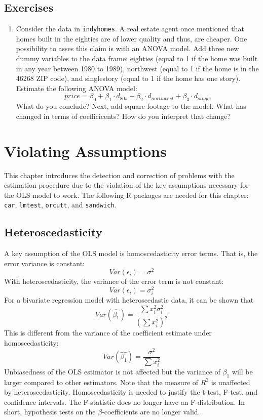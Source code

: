 \documentclass[
]{article}
\providecommand{\tightlist}{%
  \setlength{\itemsep}{0pt}\setlength{\parskip}{0pt}}
\begin{document}
\hypertarget{exercises}{%
\subsection{Exercises}\label{exercises}}

\begin{enumerate}
\def\labelenumi{\arabic{enumi}.}
\tightlist
\item
  Consider the data in \texttt{indyhomes}. A real estate agent once mentioned that homes built in the eighties are of lower quality and thus, are cheaper. One possibility to asses this claim is with an ANOVA model. Add three new dummy variables to the data frame: eighties (equal to 1 if the home was built in any year between 1980 to 1989), northwest (equal to 1 if the home is in the 46268 ZIP code), and singlestory (equal to 1 if the home has one story). Estimate the following ANOVA model:
  \[price = \beta_0+\beta_1 \cdot d_{80s}+\beta_2 \cdot d_{northwest} + \beta_3 \cdot d_{single}\]
  What do you conclude? Next, add square footage to the model. What has changed in terms of coefficicents? How do you interpret that change?
\end{enumerate}

\hypertarget{violating-assumptions}{%
\section{Violating Assumptions}\label{violating-assumptions}}

This chapter introduces the detection and correction of problems with the estimation procedure due to the violation of the key assumptions necessary for the OLS model to work. The following R packages are needed for this chapter: \texttt{car}, \texttt{lmtest}, \texttt{orcutt}, and \texttt{sandwich}.

\hypertarget{heteroscedasticity}{%
\subsection{Heteroscedasticity}\label{heteroscedasticity}}

A key assumption of the OLS model is homoscedasticity error terms. That is, the error variance is constant:
\[Var(\epsilon_i) = \sigma^2\]
With heteroscedasticity, the variance of the error term is not constant:
\[Var(\epsilon_i) = \sigma_i^2\]
For a bivariate regression model with heteroscedastic data, it can be shown that
\[Var(\hat{\beta_1}) = \frac{\sum x_i^2 \sigma_i^2}{(\sum x_i^2)^2}\]
This is different from the variance of the coefficient estimate under homoscedasticity:
\[Var(\hat{\beta_1}) = \frac{\sigma^2}{\sum x_i^2}\]
Unbiasedness of the OLS estimator is not affected but the variance of \(\beta_1\) will be larger compared to other estimators. Note that the measure of \(R^2\) is unaffected by heteroscedasticity. Homoscedasticity is needed to justify the t-test, F-test, and confidence intervals. The F-statistic does no longer have an F-distribution. In short, hypothesis tests on the \(\beta\)-coefficients are no longer valid.
\end{document}
